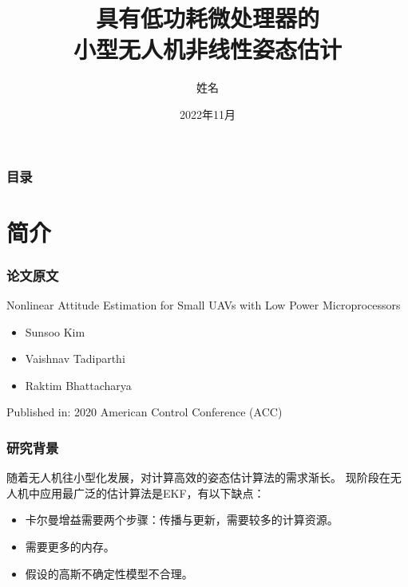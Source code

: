 \documentclass{beamer}
\title[无人机姿态估计] %
{具有低功耗微处理器的\\
	小型无人机非线性姿态估计}
\author[姓名] %
{姓名 }
\institute[SCUT] %
{
	华南理工大学 \\
	自主系统与网络控制教育部重点实验室\\
	广东省无人机系统工程技术中心	
	
}
\date[2022年11月]%
{2022年11月}
\begin{document}

	\frame{\titlepage}
	
	\begin{frame}
		\frametitle{目录}
		\tableofcontents
	\end{frame}
	\section{简介}
	
	\begin{frame}
		\frametitle{论文原文}
		
		{\Large Nonlinear Attitude Estimation for Small UAVs with Low Power Microprocessors}
		 
		\begin{itemize}
			\item Sunsoo Kim
			\item Vaishnav Tadiparthi
			\item Raktim Bhattacharya
		\end{itemize}
		Published in: 2020 American Control Conference (ACC)
	\end{frame}

	\begin{frame}
		\frametitle{研究背景}
		
		随着无人机往小型化发展，对计算高效的姿态估计算法的需求渐长。
		现阶段在无人机中应用最广泛的估计算法是EKF，有以下缺点：
		\begin{itemize}
			\item 卡尔曼增益需要两个步骤：传播与更新，需要较多的计算资源。
			\item 需要更多的内存。
			\item 假设的高斯不确定性模型不合理。
		\end{itemize}

	\end{frame}


%		
%		
%		
	
\end{document}
